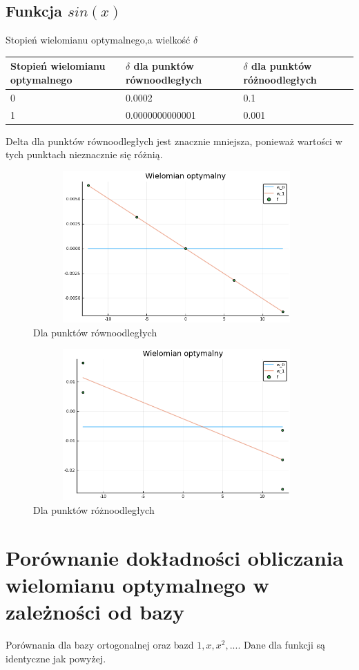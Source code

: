 \documentclass{article}
\begin{document}
\subsection{Funkcja $sin(x)$}
Stopień wielomianu optymalnego,a wielkość $\delta$
\begin{center}
    \begin{tabular}{ |p{3cm}|p{4.6cm}|p{4.6cm}|}
     \hline
     Stopień wielomianu optymalnego & $\delta$ dla punktów równoodległych & $\delta$ dla punktów różnoodległych\\
     \hline
     0 & 0.0002 & 0.1\\
     \hline
     1 & 0.0000000000001 & 0.001\\
     \hline
    \end{tabular}
\end{center}
Delta dla punktów równoodległych jest znacznie mniejsza, ponieważ wartości w tych punktach nieznacznie się różnią. 
\begin{figure}[h]
\center
\includegraphics[width=11cm,height=5.8cm]{sin.png}
\caption{Dla punktów równoodległych}
\end{figure}

\begin{figure}[h]
\centering
\includegraphics[width=11cm,height=5.8cm]{sin2.png}
\caption{Dla punktów różnoodległych}
\end{figure}
\section{Porównanie dokładności obliczania wielomianu optymalnego w zależności od bazy}
Porównania dla bazy ortogonalnej oraz bazd {$1, x, x^{2}, ...$}. Dane dla funkcji są identyczne jak powyżej.
\end{document}
